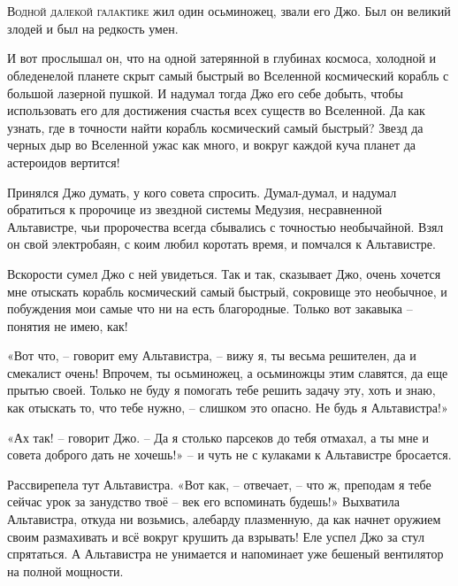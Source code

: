 \documentclass[ebook,oneside,final,openright]{memoir}
\begin{document}
\chapter{}
 \lettrine{В}{одной далекой галактике} жил один осьминожец, звали его Джо. Был он великий злодей и был на редкость умен.\par
\par
И вот прослышал он, что на одной затерянной в глубинах космоса, холодной и обледенелой планете скрыт самый быстрый во Вселенной космический корабль с большой лазерной пушкой. И надумал тогда Джо его себе добыть, чтобы использовать его для достижения счастья всех существ во Вселенной. Да как узнать, где в точности найти корабль космический самый быстрый? Звезд да черных дыр во Вселенной ужас как много, и вокруг каждой куча планет да астероидов вертится!\par
\par
Принялся Джо думать, у кого совета спросить. Думал-думал, и надумал обратиться к пророчице из звездной системы Медузия, несравненной Альтавистре, чьи пророчества всегда сбывались с точностью необычайной. Взял он свой электробаян, с коим любил коротать время, и помчался к Альтавистре.\par
\par
Вскорости сумел Джо с ней увидеться. Так и так, сказывает Джо, очень хочется мне отыскать корабль космический самый быстрый, сокровище это необычное, и побуждения мои самые что ни на есть благородные. Только вот закавыка – понятия не имею, как!\par
\par
«Вот что, – говорит ему Альтавистра, – вижу я, ты весьма решителен, да и смекалист очень! Впрочем, ты осьминожец, а осьминожцы этим славятся, да еще прытью своей. Только не буду я помогать тебе решить задачу эту, хоть и знаю, как отыскать то, что тебе нужно, – слишком это опасно. Не будь я Альтавистра!» \par
\par
«Ах так! – говорит Джо. – Да я столько парсеков до тебя отмахал, а ты мне и совета доброго дать не хочешь!» – и чуть не с кулаками к Альтавистре бросается. \par
\par
Рассвирепела тут Альтавистра. «Вот как, – отвечает, – что ж, преподам я тебе сейчас урок за занудство твоё – век его вспоминать будешь!» Выхватила Альтавистра, откуда ни возьмись, алебарду плазменную, да как начнет оружием своим размахивать и всё вокруг крушить да взрывать! Еле успел Джо за стул спрятаться. А Альтавистра не унимается и напоминает уже бешеный вентилятор на полной мощности. \par
\end{document}

